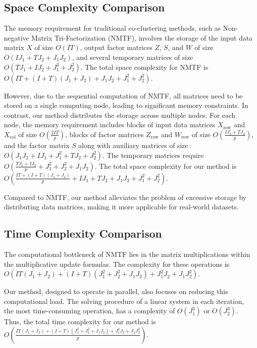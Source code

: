\documentclass[journal]{IEEEtran}
\begin{document}
\subsection{Space Complexity Comparison}

The memory requirement for traditional co-clustering methods, such as Non-negative Matrix Tri-Factorization (NMTF), involves the storage of the input data matrix $X$ of size $O(IT)$, output factor matrices $Z$, $S$, and $W$ of size $O(IJ_1 + TJ_2 + J_1J_2)$, and several temporary matrices of size $O(TJ_1 + IJ_2 + J_1^2 + J_2^2)$. The total space complexity for NMTF is $O(IT + (I + T)(J_1 + J_2) + J_1J_2 + J_1^2 + J_2^2)$.

However, due to the sequential computation of NMTF, all matrices need to be stored on a single computing node, leading to significant memory constraints. In contrast, our method distributes the storage across multiple nodes. For each node, the memory requirement includes blocks of input data matrices $X_{\text{row}}$ and $X_{\text{col}}$ of size $O\left(\frac{2IT}{p}\right)$, blocks of factor matrices $Z_{\text{row}}$ and $W_{\text{row}}$ of size $O\left(\frac{IJ_1 + TJ_2}{p}\right)$, and the factor matrix $S$ along with auxiliary matrices of size $O(J_1J_2 + IJ_1 + J_1^2 + TJ_2 + J_2^2)$. The temporary matrices require $O\left(\frac{TJ_1 + IJ_2}{p} + J_1^2 + J_2^2 + J_1J_2\right)$. The total space complexity for our method is $O\left(\frac{IT + (I + T)(J_1 + J_2)}{p} + IJ_1 + TJ_2 + J_1J_2 + J_1^2 + J_2^2\right)$.

Compared to NMTF, our method alleviates the problem of excessive storage by distributing data matrices, making it more applicable for real-world datasets.

\subsection{Time Complexity Comparison}

The computational bottleneck of NMTF lies in the matrix multiplications within the multiplicative update formulas. The complexity for these operations is $O(IT(J_1 + J_2) + (I + T)(J_1^2 + J_2^2 + J_1J_2) + J_1^2J_2 + J_1J_2^2)$.

Our method, designed to operate in parallel, also focuses on reducing this computational load. The solving procedure of a linear system in each iteration, the most time-consuming operation, has a complexity of $O(J_1^3)$ or $O(J_2^3)$. Thus, the total time complexity for our method is $O\left(\frac{IT(J_1 + J_2) + (I + T)(J_1^2 + J_2^2 + J_1J_2) + J_1^2J_2 + J_1J_2^2}{p}\right)$.
\end{document}
